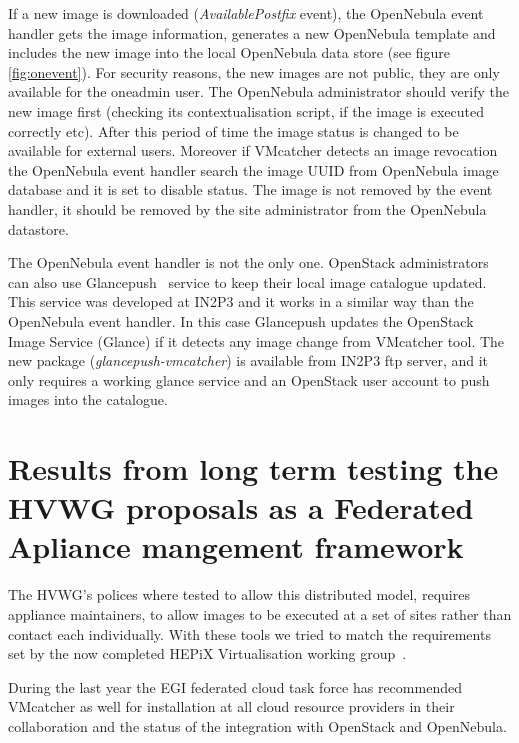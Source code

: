\documentclass{llncs_Ibergrid2013}
\begin{document}
If a new image is downloaded (\textit{AvailablePostfix} event), the OpenNebula event handler gets the image information, generates a new OpenNebula template and includes the new image into the local OpenNebula data store (see figure \ref{fig:onevent}). 
For security reasons, the new images are not public, they are only available for the oneadmin user. The OpenNebula administrator should verify the new image first (checking its contextualisation script, if the image is executed correctly etc).
After this period of time the image status is changed to be available for external users. 
Moreover if VMcatcher detects an image revocation the OpenNebula event handler search the image UUID from OpenNebula image database and it is set to disable status.
The image is not removed by the event handler, it should be removed by the site administrator from the OpenNebula datastore.

The OpenNebula event handler is not the only one. OpenStack administrators can also use Glancepush~\cite{glancepush} service to keep their local image catalogue updated. 
This service was developed at IN2P3 and it works in a similar way than the OpenNebula event handler. 
In this case Glancepush updates the OpenStack Image Service (Glance) if it detects any image change from VMcatcher tool. 
The new package (\textit{glancepush-vmcatcher}) is available from IN2P3 ftp server, and it only requires a working glance service and an OpenStack user account to push images into the catalogue.



\section{Results from long term testing the HVWG proposals as a Federated Apliance mangement framework}
\label{sect-experiances}
The HVWG's polices where tested to allow this distributed model, requires appliance maintainers, to allow images to be executed at a set of sites rather than contact each individually. With these tools we tried to match the requirements set by the now completed HEPiX Virtualisation working group~\cite{hepix}.

During the last year the EGI federated cloud task force has recommended VMcatcher as well for installation at all cloud resource providers in their collaboration and the status of the integration with OpenStack and OpenNebula.
\end{document}

